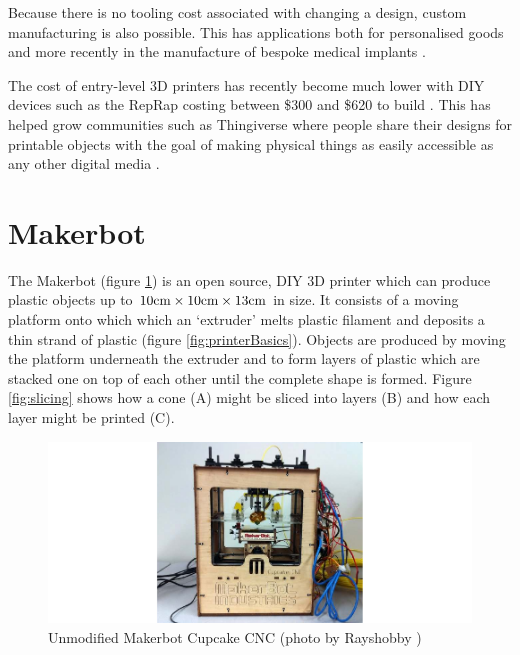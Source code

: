 		Because there is no tooling cost associated with changing a design, custom
		manufacturing is also possible. This has applications both for personalised
		goods and more recently in the manufacture of bespoke medical implants
		\cite{jaw}.
		
		The cost of entry-level 3D printers has recently become much lower with DIY
		devices such as the RepRap costing between \$300 and \$620 to build
		\cite{costsdown,reprap}. This has helped grow communities such as
		Thingiverse where people share their designs for printable objects with the
		goal of making physical things as easily accessible as any other digital
		media \cite{thingiverse}.
	
	\section{Makerbot}
		
		\label{sec:makerbot_basics}
		
		The Makerbot (figure \ref{fig:makerbotOrig}) is an open source, DIY 3D
		printer which can produce plastic objects up to
		$10\textrm{cm}\times10\textrm{cm}\times13\textrm{cm}$ in size.  It consists of a moving platform
		onto which which an `extruder' melts plastic filament and deposits a thin
		strand of plastic (figure \ref{fig:printerBasics}). Objects are produced by
		moving the platform underneath the extruder and to form layers of plastic
		which are stacked one on top of each other until the complete shape is
		formed. Figure \ref{fig:slicing} shows how a cone (A) might be sliced into
		layers (B) and how each layer might be printed (C).
	
		\begin{figure}
			\includegraphics[width=1\textwidth]{diagrams/makerbotOrig.pdf}
			\caption{Unmodified Makerbot Cupcake CNC (photo by Rayshobby
			         \cite{rayshobby})}
			\label{fig:makerbotOrig}
		\end{figure}
	
